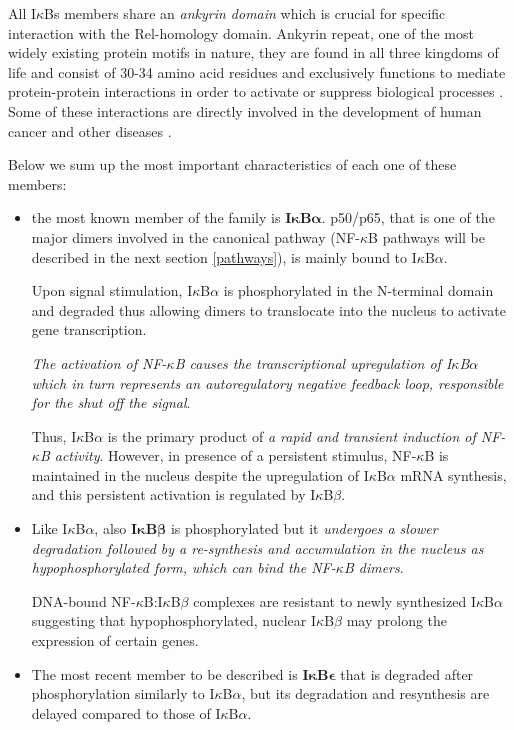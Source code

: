 \documentclass[12pt,a4paper]{report}
\begin{document}
All I$\kappa$Bs members share an \emph{ankyrin domain} which is crucial for specific interaction with the Rel-homology domain. Ankyrin repeat, one of the most widely existing protein motifs in nature, they are found in all three kingdoms of life and consist of 30-34 amino acid residues and exclusively functions to mediate protein-protein interactions in order to activate or suppress biological processes \cite{Ankyrin}. Some of these interactions are directly involved in the development of human cancer and other diseases \cite{AnkyrinMotif}.

Below we sum up the most important characteristics of each one of these members:
\begin{itemize}
 \item the most known member of the family is \textbf{I$\bm{\kappa}$B$\bm{\alpha}$}. p50/p65, that is one of the major dimers involved in the canonical pathway (NF-$\kappa$B pathways will be described in the next section \ref{pathways}), is mainly bound to I$\kappa$B$\alpha$.
 
 Upon signal stimulation, I$\kappa$B$\alpha$ is phosphorylated in the N-terminal domain and degraded thus allowing dimers to translocate into the nucleus to activate gene transcription.
 
 \emph{The activation of NF-$\kappa$B causes the transcriptional upregulation of I$\kappa$B$\alpha$ which in turn represents an autoregulatory negative feedback loop, responsible for the shut off the signal}.
 
 Thus, I$\kappa$B$\alpha$ is the primary product of \emph{a rapid and transient induction of NF-$\kappa$B activity}. However, in presence of a persistent stimulus, NF-$\kappa$B is maintained in the nucleus despite the upregulation of I$\kappa$B$\alpha$ mRNA synthesis, and this persistent activation is regulated by I$\kappa$B$\beta$.
 
 
 \item Like I$\kappa$B$\alpha$, also \textbf{I$\bm{\kappa}$B$\bm{\beta}$} is phosphorylated but it \emph{undergoes a slower degradation followed by a re-synthesis and accumulation in the nucleus as hypophosphorylated form, which can bind the NF-$\kappa$B dimers}. 
 
 DNA-bound NF-$\kappa$B:I$\kappa$B$\beta$ complexes are resistant to newly synthesized
 I$\kappa$B$\alpha$ suggesting that hypophosphorylated, nuclear I$\kappa$B$\beta$ may prolong the expression of certain genes.
 
 \item The most recent member to be described is \textbf{I$\bm{\kappa}$B$\bm{\epsilon}$} that is degraded after phosphorylation similarly to I$\kappa$B$\alpha$, but its degradation and resynthesis are delayed compared to those of I$\kappa$B$\alpha$.


\end{itemize}
\end{document}
